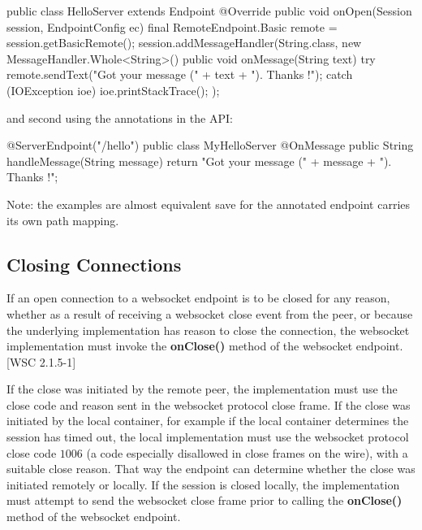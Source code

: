 \begin{listing}{1}
public class HelloServer extends Endpoint {
    @Override
    public void onOpen(Session session, EndpointConfig ec) {
        final RemoteEndpoint.Basic remote = session.getBasicRemote();
        session.addMessageHandler(String.class,
          new MessageHandler.Whole<String>() {
            public void onMessage(String text) {
                try {
                    remote.sendText("Got your message (" + text + "). Thanks !");
                } catch (IOException ioe) {
                    ioe.printStackTrace();
                }
            }
        });
    }
}
\end{listing}

and second using the annotations in the API:

\begin{listing}{1}
@ServerEndpoint("/hello")
public class MyHelloServer {
    @OnMessage
    public String handleMessage(String message) {
        return "Got your message (" + message + "). Thanks !";
    }
}
\end{listing}

Note: the examples are almost equivalent save for the annotated endpoint carries its own path mapping.

\subsection{Closing Connections}

If an open connection to a websocket endpoint is to be closed for any reason, whether as a result of receiving a websocket close event from the peer, or because the underlying implementation has reason to close the connection, the websocket implementation must invoke the \textbf{onClose()} method of the websocket endpoint. [WSC 2.1.5-1]

If the close was initiated by the remote peer, the implementation must use the close code and reason sent in the websocket protocol close frame. If the close was initiated by the local container, for example if the local container determines the session has timed out, the local implementation must use the websocket protocol close code $1006$ (a code especially disallowed in close frames on the wire), with a suitable close reason. That way the endpoint can determine whether the close was initiated remotely or locally. If the session is closed locally, the implementation must attempt to send the websocket close frame prior to calling the \textbf{onClose()} method of the websocket endpoint.

